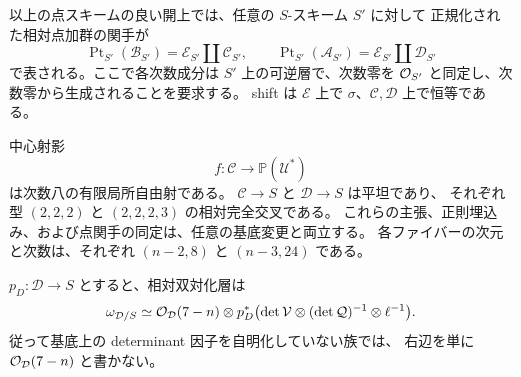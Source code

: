 \begin{theorem}[普遍的な相対点スキーム]
\label{thm:relative-point-nfold}
以上の点スキームの良い開上では、任意の $S$-スキーム $S'$ に対して
正規化された相対点加群の関手が
\[
 \operatorname{Pt}_{S'}(\mathcal B_{S'})
   =\mathcal E_{S'}\amalg\mathcal C_{S'},\qquad
 \operatorname{Pt}_{S'}(\mathcal A_{S'})
   =\mathcal E_{S'}\amalg\mathcal D_{S'}
\]
で表される。ここで各次数成分は $S'$ 上の可逆層で、次数零を
$\mathcal O_{S'}$ と同定し、次数零から生成されることを要求する。
shift は $\mathcal E$ 上で $\sigma$、$\mathcal C,\mathcal D$ 上で恒等である。

中心射影
\[
 f:\mathcal C\longrightarrow\mathbb P(\mathcal U^*)
\]
は次数八の有限局所自由射である。
$\mathcal C\to S$ と $\mathcal D\to S$ は平坦であり、
それぞれ型 $(2,2,2)$ と $(2,2,2,3)$ の相対完全交叉である。
これらの主張、正則埋込み、および点関手の同定は、任意の基底変更と両立する。
各ファイバーの次元と次数は、それぞれ $(n-2,8)$ と $(n-3,24)$ である。

$p_D:\mathcal D\to S$ とすると、相対双対化層は
\begin{equation}\label{eq:relative-point-dualizing}
 \omega_{\mathcal D/S}\simeq
 \mathcal O_{\mathcal D}(7-n)\otimes
 p_D^*\bigl(\det\mathcal V\otimes
              (\det\mathcal Q)^{-1}\otimes\ell^{-1}\bigr).
\end{equation}
従って基底上の determinant 因子を自明化していない族では、
右辺を単に $\mathcal O_{\mathcal D}(7-n)$ と書かない。
\end{theorem}

